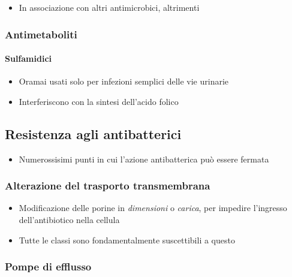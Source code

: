 \documentclass[italian,]{article}
\providecommand{\tightlist}{%
  \setlength{\itemsep}{0pt}\setlength{\parskip}{0pt}}
\begin{document}
\begin{itemize}
\tightlist
\item
  In associazione con altri antimicrobici, altrimenti
\end{itemize}

\hypertarget{antimetaboliti}{%
\subsubsection{Antimetaboliti}\label{antimetaboliti}}

\hypertarget{sulfamidici}{%
\paragraph{Sulfamidici}\label{sulfamidici}}

\begin{itemize}
\tightlist
\item
  Oramai usati solo per infezioni semplici delle vie urinarie
\item
  Interferiscono con la sintesi dell'acido folico
\end{itemize}

\hypertarget{resistenza-agli-antibatterici}{%
\subsection{Resistenza agli
antibatterici}\label{resistenza-agli-antibatterici}}

\begin{itemize}
\tightlist
\item
  Numerossisimi punti in cui l'azione antibatterica può essere fermata
\end{itemize}

\hypertarget{alterazione-del-trasporto-transmembrana}{%
\subsubsection{Alterazione del trasporto
transmembrana}\label{alterazione-del-trasporto-transmembrana}}

\begin{itemize}
\tightlist
\item
  Modificazione delle porine in \emph{dimensioni} o \emph{carica}, per
  impedire l'ingresso dell'antibiotico nella cellula
\item
  Tutte le classi sono fondamentalmente suscettibili a questo
\end{itemize}

\hypertarget{pompe-di-efflusso}{%
\subsubsection{Pompe di efflusso}\label{pompe-di-efflusso}}
\end{document}
